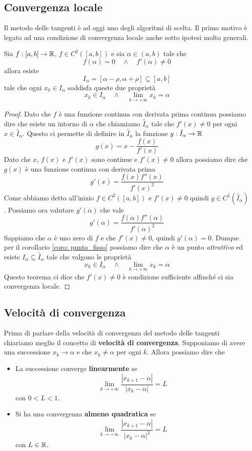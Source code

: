 \subsection{Convergenza locale}
Il metodo delle tangenti è ad oggi uno degli algoritmi di scelta. Il primo motivo è legato ad una condizione di
convergenza locale anche sotto ipotesi molto generali.

\begin{theorem}
	Sia $f : [a, b] \to \mathbb{R}$, $f \in C^2([a, b])$ e sia $\alpha \in (a, b)$ tale che
	\[ f(\alpha) = 0 \quad \wedge \quad f'(\alpha) \neq 0 \]
	allora esiste
	\[ I_\alpha = [\alpha - \rho, \alpha + \rho] \subseteq [a, b] \]
	tale che ogni $x_0 \in I_\alpha$ soddisfa queste due proprietà
	\[ x_k \in I_\alpha \quad \wedge \quad \lim_{k \to +\infty} x_k = \alpha \]
	\begin{proof}
		Dato che $f$ è una funzione continua con derivata prima continua possiamo dire che esiste un intorno di
		$\alpha$ che chiamiamo $\hat{I}_\alpha$ tale che $f'(x) \neq 0$ per ogni $x \in \hat{I}_\alpha$. Questo
		ci permette di definire in $\hat{I}_\alpha$ la funzione $g : \hat{I}_\alpha \to \mathbb{R}$
		\[ g(x) = x - \frac{f(x)}{f'(x)} \]
		Dato che $x$, $f(x)$ e $f'(x)$ sono continue e $f'(x) \neq 0$ allora possiamo dire che $g(x)$ è una
		funzione continua con derivata prima
		\[ g'(x) = \frac{f(x) f''(x)}{f'(x)^2} \]
		Come abbiamo detto all'inizio $f \in C^2([a, b])$ e $f'(x) \neq 0$ quindi $g \in C^1(\hat{I}_\alpha)$.
		Possiamo ora valutare $g'(\alpha)$ che vale
		\[ g'(\alpha) = \frac{f(\alpha) f''(\alpha)}{f'(\alpha)^2} \]
		Sappiamo che $\alpha$ è uno zero di $f$ e che $f'(x) \neq 0$, quindi $g'(\alpha) = 0$. Dunque per il
		corollario \ref{coro: punto_fisso} possiamo dire che $\alpha$ è un punto \emph{attrattivo} ed esiste
		$I_\alpha \subseteq \hat{I}_\alpha$ tale che valgono le proprietà
		\[ x_k \in I_\alpha \quad \wedge \quad \lim_{k \to +\infty} x_k = \alpha \]
		Questo teorema ci dice che $f'(x) \neq 0$ è condizione sufficiente affinché ci sia convergenza locale.
	\end{proof}
\end{theorem}

\subsection{Velocità di convergenza}
Prima di parlare della velocità di convergenza del metodo delle tangenti chiariamo meglio il concetto di
\textbf{velocità di convergenza}. Supponiamo di avere una successione $x_k \to \alpha$ e che $x_k \neq \alpha$
per ogni $k$. Allora possiamo dire che
\begin{itemize}
	\item La successione converge \textbf{linearmente} se
	      \[ \lim_{k \to +\infty} \frac{|x_{k+1} - \alpha|}{|x_k - \alpha|} = L \]
	      con $0 < L < 1$.
	\item Si ha una convergenza \textbf{almeno quadratica} se
	      \[ \lim_{k \to +\infty} \frac{|x_{k+1} - \alpha|}{|x_k - \alpha|^2} = L \]
	      con $L \in \mathbb{R}$.
\end{itemize}

